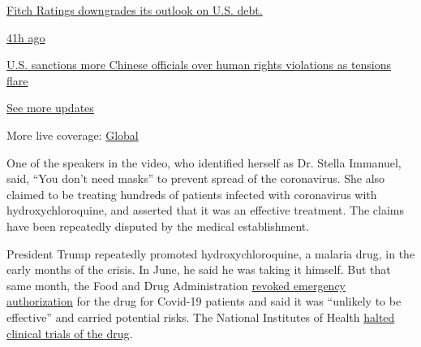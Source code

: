 \href{https://www.nytimes3xbfgragh.onion/live/2020/07/31/business/stock-market-today-coronavirus?action=click\&pgtype=Article\&state=default\&region=MAIN_CONTENT_1\&context=storylines_live_updates\#fitch-ratings-downgrades-its-outlook-on-us-debt}{Fitch
Ratings downgrades its outlook on U.S. debt.}

\href{https://www.nytimes3xbfgragh.onion/live/2020/07/31/business/stock-market-today-coronavirus?action=click\&pgtype=Article\&state=default\&region=MAIN_CONTENT_1\&context=storylines_live_updates\#us-sanctions-more-chinese-officials-over-human-rights-violations-as-tensions-flare}{41h
ago}

\href{https://www.nytimes3xbfgragh.onion/live/2020/07/31/business/stock-market-today-coronavirus?action=click\&pgtype=Article\&state=default\&region=MAIN_CONTENT_1\&context=storylines_live_updates\#us-sanctions-more-chinese-officials-over-human-rights-violations-as-tensions-flare}{U.S.
sanctions more Chinese officials over human rights violations as
tensions flare}

\href{https://www.nytimes3xbfgragh.onion/live/2020/07/31/business/stock-market-today-coronavirus?action=click\&pgtype=Article\&state=default\&region=MAIN_CONTENT_1\&context=storylines_live_updates}{See
more updates}

More live coverage:
\href{https://www.nytimes3xbfgragh.onion/2020/08/01/world/coronavirus-covid-19.html?action=click\&pgtype=Article\&state=default\&region=MAIN_CONTENT_1\&context=storylines_live_updates}{Global}

One of the speakers in the video, who identified herself as Dr. Stella
Immanuel, said, ``You don't need masks'' to prevent spread of the
coronavirus. She also claimed to be treating hundreds of patients
infected with coronavirus with hydroxychloroquine, and asserted that it
was an effective treatment. The claims have been repeatedly disputed by
the medical establishment.

President Trump repeatedly promoted hydroxychloroquine, a malaria drug,
in the early months of the crisis. In June, he said he was taking it
himself. But that same month, the Food and Drug Administration
\href{https://www.fda.gov/media/138945/download}{revoked emergency
authorization} for the drug for Covid-19 patients and said it was
``unlikely to be effective'' and carried potential risks. The National
Institutes of Health
\href{https://www.nytimes3xbfgragh.onion/2020/06/20/health/hydroxychloroquine-coronavirus-trial.html}{halted
clinical trials of the drug}.

